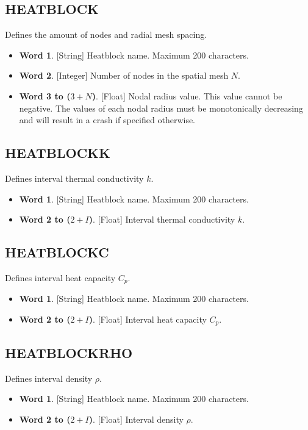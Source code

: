 \documentclass[11pt,letterpaper,titlepage]{article}
\begin{document}
\vspace{0.5cm}
\subsection{HEATBLOCK}
Defines the amount of nodes and radial mesh spacing.
\begin{itemize}
\item \textbf{Word 1}. [String] Heatblock name. Maximum 200 characters.
\item \textbf{Word 2}. [Integer] Number of nodes in the spatial mesh $N$.
\item \textbf{Word 3 to ($3+N$)}. [Float] Nodal radius value. This value cannot be negative. The values of each nodal radius must be monotonically decreasing and will result in a crash if specified otherwise.
\end{itemize}

\vspace{0.5cm}
\subsection{HEATBLOCKK}
Defines interval thermal conductivity $k$.
\begin{itemize}
\item \textbf{Word 1}. [String] Heatblock name. Maximum 200 characters.
\item \textbf{Word 2 to ($2+I$)}. [Float] Interval thermal conductivity $k$.
\end{itemize}

\vspace{0.5cm}
\subsection{HEATBLOCKC}
Defines interval heat capacity $C_p$.
\begin{itemize}
\item \textbf{Word 1}. [String] Heatblock name. Maximum 200 characters.
\item \textbf{Word 2 to ($2+I$)}. [Float] Interval heat capacity $C_p$.
\end{itemize}

\vspace{0.5cm}
\subsection{HEATBLOCKRHO}
Defines interval density $\rho$.
\begin{itemize}
\item \textbf{Word 1}. [String] Heatblock name. Maximum 200 characters.
\item \textbf{Word 2 to ($2+I$)}. [Float] Interval density $\rho$.
\end{itemize}
\end{document}
